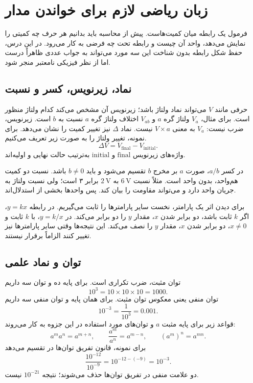 \section{زبان ریاضی لازم برای خواندن مدار}
\label{sec:foundation-math}
فرمول یک رابطه میان کمیت‌هاست. پیش از محاسبه باید بدانیم هر حرف چه کمیتی را
نمایش می‌دهد، واحد آن چیست و رابطه تحت چه فرضی به کار می‌رود.
در این درس، حفظ شکل رابطه بدون شناخت این سه مورد می‌تواند به جواب عددی ظاهراً درست
اما از نظر فیزیکی نامعتبر منجر شود.

\subsection{نماد، زیرنویس، کسر و نسبت}
حرفی مانند \(V\) می‌تواند نماد ولتاژ باشد؛ زیرنویس آن مشخص می‌کند کدام ولتاژ
منظور است. برای مثال، \(V_a\) ولتاژ گره \(a\) و \(V_{ab}\) اختلاف ولتاژ
گره \(a\) نسبت به \(b\) است. زیرنویس، ضرب نیست: \(V_a\) به معنی \(V\times a\) نیست.
نماد \(\Delta\) نیز تغییر کمیت را نشان می‌دهد. برای نمونه، تغییر ولتاژ را
به صورت زیر تعریف می‌کنیم.
\[
 \Delta V=V_{\mathrm{final}}-V_{\mathrm{initial}}.
\]
واژه‌های زیرنویس \(\mathrm{final}\) و \(\mathrm{initial}\) به‌ترتیب حالت نهایی و اولیه‌اند.

در کسر \(a/b\)، صورت \(a\) بر مخرج \(b\) تقسیم می‌شود و باید \(b\ne0\) باشد.
نسبت دو کمیت هم‌واحد، بدون واحد است. مثلاً نسبت \(\qty{6}{\volt}\)
به \(\qty{2}{\volt}\) برابر ۳ است؛ ولی نسبت ولتاژ به جریان واحد دارد
و می‌تواند مقاومت را بیان کند. پس واحدها بخشی از استدلال‌اند.

برای دیدن اثر یک پارامتر، نخست سایر پارامترها را ثابت می‌گیریم.
در رابطه \(y=kx\)، اگر \(k\) ثابت باشد، دو برابر شدن \(x\)، مقدار \(y\) را
دو برابر می‌کند. در \(y=k/x\)، با \(k\) ثابت و \(x\ne0\)، دو برابر شدن
\(x\)، مقدار \(y\) را نصف می‌کند. این نتیجه‌ها وقتی سایر پارامترها نیز
تغییر کنند الزاماً برقرار نیستند.

\subsection{توان و نماد علمی}
توان مثبت، ضرب تکراری است. برای پایه ده و توان سه داریم
\[
 10^3=10\times10\times10=1000.
\]
توان منفی یعنی معکوس توان مثبت. برای همان پایه و توان منفی سه داریم
\[
 10^{-3}=\frac{1}{10^3}=0.001.
\]
قواعد زیر برای پایه مثبت \(a\) و توان‌های مورد استفاده در این جزوه به کار می‌روند:
\begin{equation}\label{eq:foundation-powers}
a^m a^n=a^{m+n},\qquad
\frac{a^m}{a^n}=a^{m-n},\qquad
(a^m)^n=a^{mn}.
\end{equation}
برای نمونه، قانون تفریق توان‌ها در تقسیم می‌دهد
\[
 \frac{10^{-12}}{10^{-9}}=10^{-12-(-9)}=10^{-3}.
\]
دو علامت منفی در تفریق توان‌ها حذف می‌شوند؛ نتیجه \(10^{-21}\) نیست.


